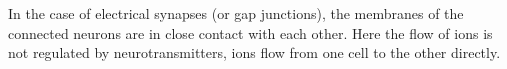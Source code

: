 \documentclass[class={myRUCProject}, crop=false]{standalone}
\begin{document}
In the case of electrical synapses (or gap junctions), the membranes of the connected neurons are in close contact with each other. Here the flow of ions is not regulated by neurotransmitters, ions flow from one cell to the other directly.
\end{document}
